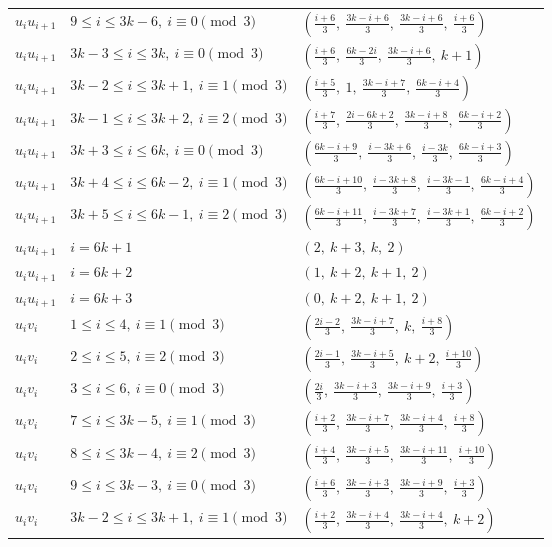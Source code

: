 \begin{longtable}{lll}
$u_i u_{i+1}$ & $9 \le i \le 3k-6,\ i \equiv 0 \pmod{3}$ & $(\frac{i+6}{3},\ \frac{3k-i+6}{3},\ \frac{3k-i+6}{3},\ \frac{i+6}{3})$ \\
$u_i u_{i+1}$ & $3k-3 \le i \le 3k,\ i \equiv 0 \pmod{3}$ & $(\frac{i+6}{3},\ \frac{6k-2i}{3},\ \frac{3k-i+6}{3},\ k+1)$ \\
$u_i u_{i+1}$ & $3k-2 \le i \le 3k+1,\ i \equiv 1 \pmod{3}$ & $(\frac{i+5}{3},\ 1,\ \frac{3k-i+7}{3},\ \frac{6k-i+4}{3})$ \\
$u_i u_{i+1}$ & $3k-1 \le i \le 3k+2,\ i \equiv 2 \pmod{3}$ & $(\frac{i+7}{3},\ \frac{2i-6k+2}{3},\ \frac{3k-i+8}{3},\ \frac{6k-i+2}{3})$ \\
$u_i u_{i+1}$ & $3k+3 \le i \le 6k,\ i \equiv 0 \pmod{3}$ & $(\frac{6k-i+9}{3},\ \frac{i-3k+6}{3},\ \frac{i-3k}{3},\ \frac{6k-i+3}{3})$ \\
$u_i u_{i+1}$ & $3k+4 \le i \le 6k-2,\ i \equiv 1 \pmod{3}$ & $(\frac{6k-i+10}{3},\ \frac{i-3k+8}{3},\ \frac{i-3k-1}{3},\ \frac{6k-i+4}{3})$ \\
$u_i u_{i+1}$ & $3k+5 \le i \le 6k-1,\ i \equiv 2 \pmod{3}$ & $(\frac{6k-i+11}{3},\ \frac{i-3k+7}{3},\ \frac{i-3k+1}{3},\ \frac{6k-i+2}{3})$ \\
$u_i u_{i+1}$ & $i = 6k+1$ & $(2,\ k+3,\ k,\ 2)$ \\
$u_i u_{i+1}$ & $i = 6k+2$ & $(1,\ k+2,\ k+1,\ 2)$ \\
$u_i u_{i+1}$ & $i = 6k+3$ & $(0,\ k+2,\ k+1,\ 2)$ \\
$u_i v_i$ & $1 \le i \le 4,\ i \equiv 1 \pmod{3}$ & $(\frac{2i-2}{3},\ \frac{3k-i+7}{3},\ k,\ \frac{i+8}{3})$ \\
$u_i v_i$ & $2 \le i \le 5,\ i \equiv 2 \pmod{3}$ & $(\frac{2i-1}{3},\ \frac{3k-i+5}{3},\ k+2,\ \frac{i+10}{3})$ \\
$u_i v_i$ & $3 \le i \le 6,\ i \equiv 0 \pmod{3}$ & $(\frac{2i}{3},\ \frac{3k-i+3}{3},\ \frac{3k-i+9}{3},\ \frac{i+3}{3})$ \\
$u_i v_i$ & $7 \le i \le 3k-5,\ i \equiv 1 \pmod{3}$ & $(\frac{i+2}{3},\ \frac{3k-i+7}{3},\ \frac{3k-i+4}{3},\ \frac{i+8}{3})$ \\
$u_i v_i$ & $8 \le i \le 3k-4,\ i \equiv 2 \pmod{3}$ & $(\frac{i+4}{3},\ \frac{3k-i+5}{3},\ \frac{3k-i+11}{3},\ \frac{i+10}{3})$ \\
$u_i v_i$ & $9 \le i \le 3k-3,\ i \equiv 0 \pmod{3}$ & $(\frac{i+6}{3},\ \frac{3k-i+3}{3},\ \frac{3k-i+9}{3},\ \frac{i+3}{3})$ \\
$u_i v_i$ & $3k-2 \le i \le 3k+1,\ i \equiv 1 \pmod{3}$ & $(\frac{i+2}{3},\ \frac{3k-i+4}{3},\ \frac{3k-i+4}{3},\ k+2)$ \\

\end{longtable}
